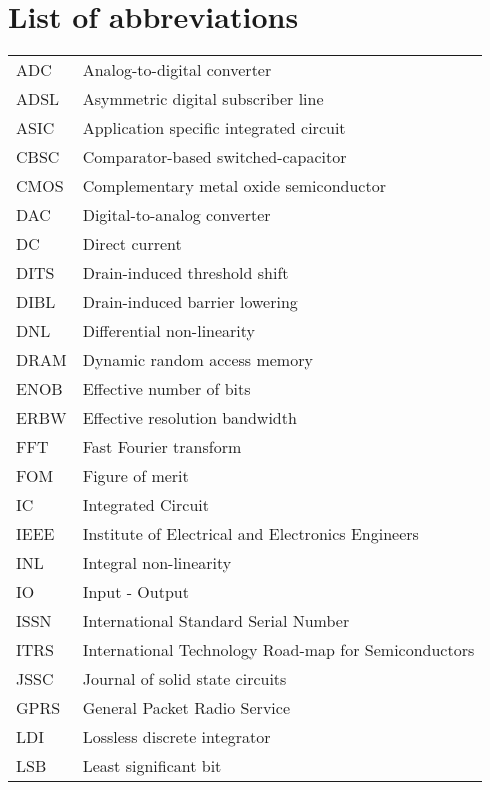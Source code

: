 
\chapter*{List of abbreviations} 
\begin{tabular}{l l}
ADC & Analog-to-digital converter\\
ADSL & Asymmetric digital subscriber line\\
ASIC & Application specific integrated circuit\\
CBSC & Comparator-based switched-capacitor\\
CMOS & Complementary metal oxide semiconductor\\
DAC & Digital-to-analog converter\\
DC & Direct current\\
DITS & Drain-induced threshold shift\\
DIBL & Drain-induced barrier lowering\\
DNL & Differential non-linearity\\
DRAM & Dynamic random access memory\\
ENOB & Effective number of bits\\
ERBW & Effective resolution bandwidth\\
FFT & Fast Fourier transform\\
FOM & Figure of merit\\
IC & Integrated Circuit\\
IEEE & Institute of Electrical and Electronics Engineers\\
INL & Integral non-linearity\\
IO & Input - Output \\
ISSN & International Standard Serial Number\\
ITRS & International Technology Road-map for Semiconductors\\
JSSC & Journal of solid state circuits\\
GPRS &General Packet Radio Service\\
LDI & Lossless discrete integrator\\
LSB & Least significant bit\\


\end{tabular} 

